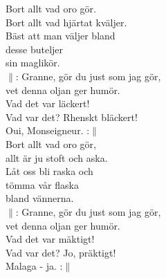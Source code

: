 \documentclass[a6paper, 10pt, twoside]{article}
\begin{document}
\noindent
\begin{center}
\end{center}
\begin{lyrics}
Bort allt vad oro gör.\\
Bort allt vad hjärtat kväljer.\\
Bäst att man väljer bland\\
desse buteljer\\
sin maglikör.
\vspace{5pt}\\
$\|$: Granne, gör du just som jag gör,\\
vet denna oljan ger humör.\\
Vad det var läckert!\\
Vad var det? Rhenskt bläckert!\\
Oui, Monseigneur. :$\|$
\vspace{5pt}\\
Bort allt vad oro gör,\\
allt är ju stoft och aska.\\
Låt oss bli raska och\\
tömma vår flaska\\
bland vännerna.
\vspace{5pt}\\
$\|$: Granne, gör du just som jag gör,\\
vet denna oljan ger humör.\\
Vad det var mäktigt!\\
Vad var det? Jo, präktigt!\\
Malaga - ja. :$\|$
\end{lyrics}
\end{document}
